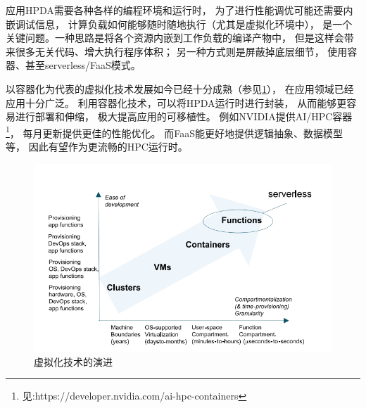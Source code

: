 应用HPDA需要各种各样的编程环境和运行时，
为了进行性能调优可能还需要内嵌调试信息，
计算负载如何能够随时随地执行（尤其是虚拟化环境中），
是一个关键问题。一种思路是将各个资源内嵌到工作负载的编译产物中，
但是这样会带来很多无关代码、增大执行程序体积；
另一种方式则是屏蔽掉底层细节，
使用容器、甚至serverless/FaaS模式。

以容器化为代表的虚拟化技术发展如今已经十分成熟（参见\cref{virtualization}），
在应用领域已经应用十分广泛。
利用容器化技术，可以将HPDA运行时进行封装，
从而能够更容易进行部署和伸缩，
极大提高应用的可移植性。
例如NVIDIA提供AI/HPC容器\footnote{见:https://developer.nvidia.com/ai-hpc-containers}，
每月更新提供更佳的性能优化。
而FaaS能更好地提供逻辑抽象、数据模型等，
因此有望作为更流畅的HPC运行时\cite{hpc_future}。

\begin{figure}[ht!]
    \centering
    \includegraphics[width=\linewidth]{images/evolution-of-virtualization.png}
    \caption{虚拟化技术的演进\cite{hpc_future}}
    \label{virtualization}
\end{figure}